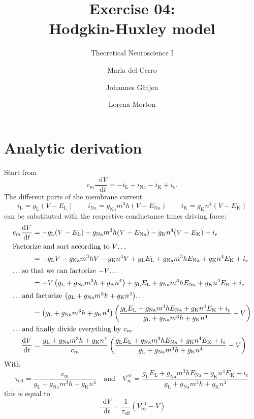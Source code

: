 \documentclass{scrartcl}
\title{Exercise 04:\\Hodgkin-Huxley model}
\subtitle{Theoretical Neuroscience I}
\author{Maria del Cerro \and Johannes G\"atjen \and Lorena Morton}
\newcommand*\diff{\mathop{}\!\mathrm{d}}
\begin{document}
\maketitle
\section{Analytic derivation}

Start from
\begin{equation*}
c_m\frac{\diff V}{\diff t} = -i_\mathrm{L}-i_\mathrm{Na} -i_\mathrm{K} + i_e.
\end{equation*}
The different parts of the membrane current
\begin{equation*}
i_\mathrm{L} = g_\mathrm{L}(V-E_\mathrm{L}) \qquad i_\mathrm{Na} = g_\mathrm{Na}m^3h(V-E_\mathrm{Na}) \qquad i_\mathrm{K} = g_\mathrm{K}n^4(V-E_\mathrm{K})
\end{equation*}
can be substituted with the respective conductance times driving force:
\begin{align*}
c_m\frac{\diff V}{\diff t} &= -g_\mathrm{L}(V-E_\mathrm{L}) - g_\mathrm{Na}m^3h(V-E_\mathrm{Na}) - g_\mathrm{K}n^4(V-E_\mathrm{K}) + i_e\\
\shortintertext{Factorize and sort according to $V$\dots}
&= -g_\mathrm{L}V  - g_\mathrm{Na}m^3h V - g_\mathrm{K}n^4 V + g_\mathrm{L}E_\mathrm{L} + g_\mathrm{Na}m^3hE_\mathrm{Na}+ g_\mathrm{K}n^4E_\mathrm{K} + i_e\\
\shortintertext{\dots so that we can factorize $-V$\dots}
&= -V \left(g_\mathrm{L} + g_\mathrm{Na}m^3h + g_\mathrm{K}n^4\right) + g_\mathrm{L}E_\mathrm{L} + g_\mathrm{Na}m^3hE_\mathrm{Na}+ g_\mathrm{K}n^4E_\mathrm{K} + i_e\\
\shortintertext{\dots and factorize $\left(g_\mathrm{L} + g_\mathrm{Na}m^3h + g_\mathrm{K}n^4\right)$\dots}
&= \left(g_\mathrm{L} + g_\mathrm{Na}m^3h + g_\mathrm{K}n^4\right)\left(\frac{g_\mathrm{L}E_\mathrm{L} + g_\mathrm{Na}m^3hE_\mathrm{Na}+ g_\mathrm{K}n^4E_\mathrm{K} + i_e}{g_\mathrm{L} + g_\mathrm{Na}m^3h + g_\mathrm{K}n^4} - V\right)\\
\shortintertext{\dots and finally divide everything by $c_m$.}
\frac{\diff V}{\diff t} &= \frac{g_\mathrm{L} + g_\mathrm{Na}m^3h + g_\mathrm{K}n^4}{c_m}\left(\frac{g_\mathrm{L}E_\mathrm{L} + g_\mathrm{Na}m^3hE_\mathrm{Na}+ g_\mathrm{K}n^4E_\mathrm{K} + i_e}{g_\mathrm{L} + g_\mathrm{Na}m^3h + g_\mathrm{K}n^4} - V\right)\\
\end{align*}
With
\begin{equation*}
\tau_\mathrm{eff} = \frac{c_m}{g_\mathrm{L} + g_\mathrm{Na}m^3h + g_\mathrm{K}n^4} \quad \text{and} \quad V_\infty^\mathrm{eff} = \frac{g_\mathrm{L}E_\mathrm{L} + g_\mathrm{Na}m^3hE_\mathrm{Na}+ g_\mathrm{K}n^4E_\mathrm{K} + i_e}{g_\mathrm{L} + g_\mathrm{Na}m^3h + g_\mathrm{K}n^4}
\end{equation*}
this is equal to
\begin{equation*}
\frac{\diff V}{\diff t} = \frac{1}{\tau_\mathrm{eff}}\left(V_\infty^\mathrm{eff} - V\right)
\end{equation*}
\end{document}
